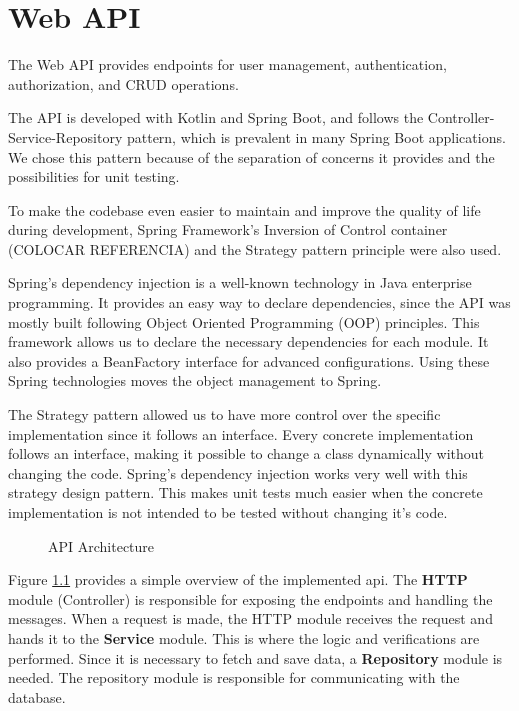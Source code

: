 \chapter{Web API} \label{cap:web_api}
The Web API provides endpoints for user management, authentication, authorization, and CRUD operations. 

The API is developed with Kotlin and Spring Boot, and follows the Controller-Service-Repository pattern, which is prevalent in many Spring Boot applications. We chose this pattern because of the separation of concerns it provides and the possibilities for unit testing.

To make the codebase even easier to maintain and improve the quality of life during development, Spring Framework's Inversion of Control container (COLOCAR REFERENCIA) and the Strategy pattern principle were also used. 

Spring's dependency injection is a well-known technology in Java enterprise programming. It provides an easy way to declare dependencies, since the API was mostly built following Object Oriented Programming (OOP) principles. This framework allows us to declare the necessary dependencies for each module. It also provides a BeanFactory interface for advanced configurations. Using these Spring technologies moves the object management to Spring.

The Strategy pattern allowed us to have more control over the specific implementation since it follows an interface. Every concrete implementation follows an interface, making it possible to change a class dynamically without changing the code. Spring's dependency injection works very well with this strategy design pattern. This makes unit tests much easier when the concrete implementation is not intended to be tested without changing it's code.

\begin{figure}[H]
    \centering
    
    \caption{API Architecture}
    \label{fig:api_architecture}
\end{figure}

Figure \ref{fig:api_architecture} provides a simple overview of the implemented \acs{api}. The \textbf{HTTP} module (Controller) is responsible for exposing the endpoints and handling the messages. When a request is made, the HTTP module receives the request and hands it to the \textbf{Service} module. This is where the logic and verifications are performed. Since it is necessary to fetch and save data, a \textbf{Repository} module is needed. The repository module is responsible for communicating with the database.

